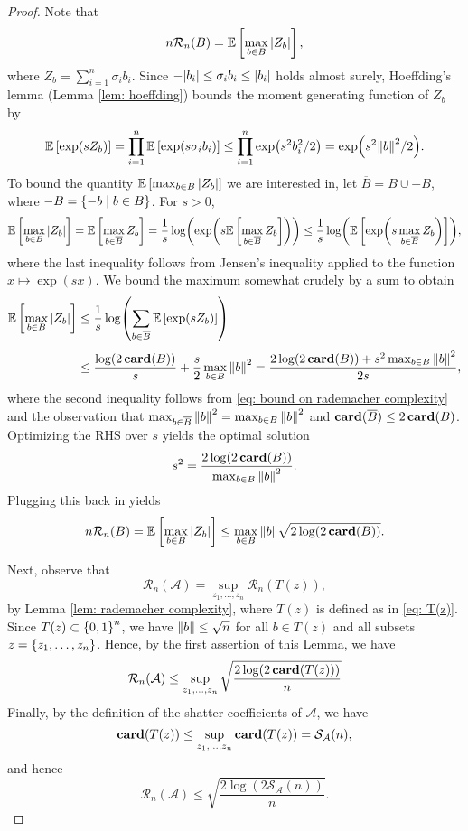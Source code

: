 \begin{proof}
Note that
\[
    n \mathcal{R}_n(B) = \mathbb{E}\left[ \max_{b \in B} \abs{Z_b} \right],
\]
where $Z_b = \sum_{i=1}^n \sigma_i b_i$. Since $-\abs{b_i} \leq \sigma_i b_i \leq \abs{b_i}$ holds almost surely, Hoeffding's lemma (Lemma \ref{lem: hoeffding}) bounds the moment generating function of $Z_b$ by
\begin{equation}
\label{eq: bound on rademacher complexity}
    \mathbb{E}\left[\exp(s Z_b)\right] = \prod_{i=1}^n \mathbb{E}\left[\exp(s \sigma_i b_i)\right] \leq \prod_{i=1}^n \exp(s^2 b_i^2 / 2) = \exp(s^2 \norm{b}^2 / 2).
\end{equation}
To bound the quantity $\mathbb{E}\left[\max_{b \in B} \abs{Z_b}\right]$ we are interested in, let $\overline{B} = B \cup -B$, where $-B = \left\{-b \mathrel{|} b \in B\right\}$. For $s>0$,
\[
    \mathbb{E}\left[\max_{b \in B} \abs{Z_b}\right] = \mathbb{E}\left[\max_{b \in \overline{B}} Z_b\right] = \frac{1}{s} \log( \exp( s \mathbb{E}\left[\max_{b \in \overline{B}} Z_b\right] )) \leq \frac{1}{s} \log(\mathbb{E}\left[ \exp( s \max_{b \in \overline{B}} Z_b )\right] ),
\]
where the last inequality follows from Jensen's inequality applied to the function $x \mapsto \exp(sx)$. We bound the maximum somewhat crudely by a sum to obtain
\begin{align*}
    \mathbb{E}\left[\max_{b \in B} \abs{Z_b}\right] &\leq \frac{1}{s} \log( \sum_{b \in \overline{B}} \mathbb{E}\left[\exp(s Z_b)\right] ) \\[4pt]
        &\leq \frac{\log(2 \, \mathrm{\mathbf{card}}(B))}{s} + \frac{s}{2} \max_{b \in B} \norm{b}^2 = \frac{2 \log(2 \, \mathrm{\mathbf{card}}(B)) + s^2 \max_{b \in B} \norm{b}^2}{2s},
\end{align*}
where the second inequality follows from \eqref{eq: bound on rademacher complexity} and the observation that $\max_{b \in \overline{B}} \norm{b}^2 = \max_{b \in B} \norm{b}^2$ and $\mathrm{\mathbf{card}}(\overline{B}) \leq 2 \, \mathrm{\mathbf{card}}(B)$. Optimizing the RHS over $s$ yields the optimal solution
\[
    s^2 = \frac{2 \log(2 \, \mathrm{\mathbf{card}}(B))}{\max_{b \in B} \norm{b}^2}.
\]
Plugging this back in yields
\[
    n \mathcal{R}_n(B) = \mathbb{E}\left[ \max_{b \in B} \abs{Z_b} \right] \leq \max_{b \in B} \norm{b} \sqrt{2 \log(2 \, \mathrm{\mathbf{card}}(B))}.
\]

Next, observe that
\[
    \mathcal{R}_n(\mathcal{A}) = \sup_{z_1, \dots, z_n} \mathcal{R}_n(T(z)),
\]
by Lemma \ref{lem: rademacher complexity}, where $T(z)$ is defined as in \eqref{eq: T(z)}. Since $T(z) \subset \left\{0, 1\right\}^n$, we have $\norm{b} \leq \sqrt{n}$ for all $b \in T(z)$ and all subsets $z = \left\{z_1, \dots, z_n\right\}$. Hence, by the first assertion of this Lemma, we have
\[
    \mathcal{R}_n(\mathcal{A}) \leq \sup_{z_1, \dots, z_n} \sqrt{\frac{2 \log(2 \, \mathrm{\mathbf{card}}(T(z)))}{n}}
\]
Finally, by the definition of the shatter coefficients of $\mathcal{A}$, we have
\[
    \mathrm{\mathbf{card}}(T(z)) \leq \sup_{z_1, \dots, z_n} \mathrm{\mathbf{card}}(T(z)) = \mathcal{S}_{\mathcal{A}}(n),
\]
and hence
\[
    \mathcal{R}_n(\mathcal{A}) \leq \sqrt{ \frac{2 \log(2 \mathcal{S}_{\mathcal{A}}(n)) }{n} }.
\]
\end{proof}


